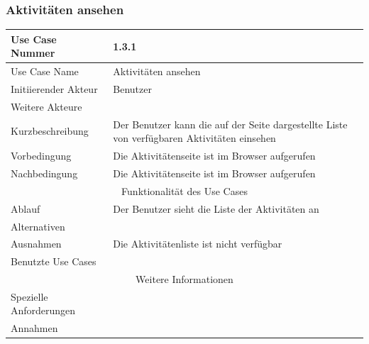 \documentclass[10pt,a4paper]{article}
\begin{document}
	\subsubsection{Aktivit\"aten ansehen}
	\begin{tabularx}{\textwidth}{|l|X|}
	\hline Use Case Nummer & 1.3.1 \\ 
	\hline Use Case Name & Aktivit\"aten ansehen \\ 
	\hline Initiierender Akteur & Benutzer \\
	\hline Weitere Akteure & \\
	\hline Kurzbeschreibung & Der Benutzer kann die auf der Seite dargestellte Liste von verf\"ugbaren Aktivit\"aten einsehen \\
	\hline Vorbedingung & Die Aktivit\"atenseite ist im Browser aufgerufen \\
	\hline Nachbedingung & Die Aktivit\"atenseite ist im Browser aufgerufen \\
	\hline \multicolumn{2}{|c|}{Funktionalität des Use Cases}\\
	\hline Ablauf & Der Benutzer sieht die Liste der Aktivit\"aten an \\
	\hline Alternativen & \\
	\hline Ausnahmen & Die Aktivit\"atenliste ist nicht verf\"ugbar \\
	\hline Benutzte Use Cases & \\
	\hline \multicolumn{2}{|c|}{Weitere Informationen} \\
	\hline Spezielle Anforderungen & \\
	\hline Annahmen & \\
	\hline
	\end{tabularx} 
\end{document}
